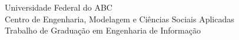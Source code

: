   \begin{capa}%
    \center
	\ABNTEXchapterfont\large{Universidade Federal do ABC \\ Centro de Engenharia, Modelagem e Ciências Sociais Aplicadas\\ Trabalho de Graduação em Engenharia de Informação}

    \vfill
    \ABNTEXchapterfont\bfseries\LARGE\imprimirtitulo
    \vfill

	\ABNTEXchapterfont\large\imprimirautor
	\vfill
	
	\large\imprimirdata
	\\
    \large\imprimirlocal 

    \vspace*{1cm}
  \end{capa}
